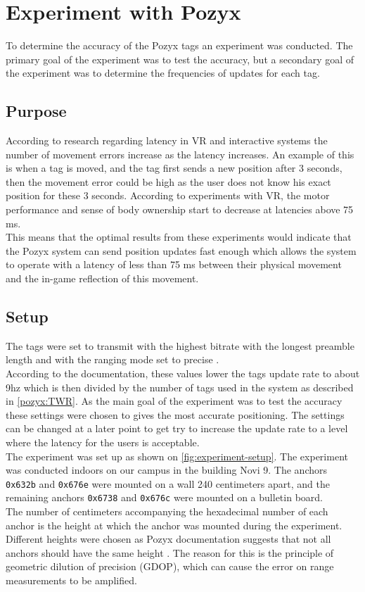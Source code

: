 \section{Experiment with Pozyx}\label{sprint1:experiment}
To determine the accuracy of the Pozyx tags an experiment was conducted.
The primary goal of the experiment was to test the accuracy, but a secondary goal of the experiment was to determine the frequencies of updates for each tag.
\\
\subsection{Purpose}
According to research regarding latency in VR \cite{WaltemateThomas2016Tiol} and interactive systems \cite{10.1145/169059.169431} the number of movement errors increase as the latency increases.
An example of this is when a tag is moved, and the tag first sends a new position after 3 seconds, then the movement error could be high as the user does not know his exact position for these 3 seconds.
According to experiments with VR, the motor performance and sense of body ownership start to decrease at latencies above 75 ms.\\
This means that the optimal results from these experiments would indicate that the Pozyx system can send position updates fast enough which allows the system to operate with a latency of less than 75 ms between their physical movement and the in-game reflection of this movement.

\subsection{Setup}
The tags were set to transmit with the highest bitrate with the longest preamble length and with the ranging mode set to precise \cite{pozyx-Performance}.\\
According to the documentation, these values lower the tags update rate to about 9hz which is then divided by the number of tags used in the system as described in \autoref{pozyx:TWR}.
As the main goal of the experiment was to test the accuracy these settings were chosen to gives the most accurate positioning.
The settings can be changed at a later point to get try to increase the update rate to a level where the latency for the users is acceptable.\\
The experiment was set up as shown on \autoref{fig:experiment-setup}.
The experiment was conducted indoors on our campus in the building Novi 9.
The anchors \texttt{0x632b} and \texttt{0x676e} were mounted on a wall 240 centimeters apart, and the remaining anchors \texttt{0x6738} and \texttt{0x676c} were mounted on a bulletin board.\\
The number of centimeters accompanying the hexadecimal number of each anchor is the height at which the anchor was mounted during the experiment.
Different heights were chosen as Pozyx documentation suggests that not all anchors should have the same height \cite{pozyx-AnchorHeights}.
The reason for this is the principle of geometric dilution of precision (GDOP), which can cause the error on range measurements to be amplified.

